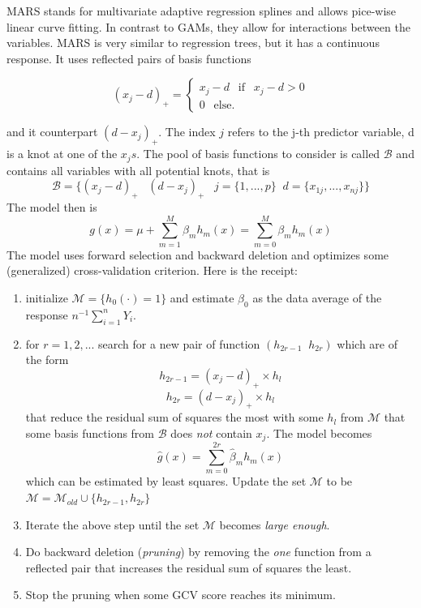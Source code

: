 \documentclass[]{book}
\providecommand{\tightlist}{%
  \setlength{\itemsep}{0pt}\setlength{\parskip}{0pt}}
\begin{document}
MARS stands for multivariate adaptive regression splines and allows
pice-wise linear curve fitting. In contrast to GAMs, they allow for
interactions between the variables. MARS is very similar to regression
trees, but it has a continuous response. It uses reflected pairs of
basis functions

\begin{equation} 
  (x_j -d)_{+} = \begin{cases} x_j - d \;\;\ \text{if} \;\;\ x_j - d > 0 \\ 
  0 \;\;\ \text{else}. 
  \end{cases} 
\end{equation}

and it counterpart \((d - x_j)_{+}\). The index \(j\) refers to the j-th
predictor variable, d is a knot at one of the \(x_js\). The pool of
basis functions to consider is called \(\mathcal{B}\) and contains all
variables with all potential knots, that is \[
\mathcal{B} = \{(x_j - d)_+ \;\;\; (d - x_j)_+ \;\;\;j = \{1, ..., p\} \;\; d =
\{x_{1j}, ..., x_{nj}\}\}\] The model then is
\[ g(x)  = \mu + \sum\limits_{m =
1}^M\beta_m h_m(x) = \sum\limits_{m = 0}^M\beta_m h_m(x)\] The model
uses forward selection and backward deletion and optimizes some
(generalized) cross-validation criterion. Here is the receipt:

\begin{enumerate}
\def\labelenumi{\arabic{enumi}.}
\tightlist
\item
  initialize \(\mathcal{M} = \{h_0(\cdot) = 1\}\) and estimate
  \(\beta_0\) as the data average of the response
  \(n^{-1}\sum\limits_{i = 1}^n Y_i\).
\item
  for \(r = 1, 2, ...\) search for a new pair of function
  \((h_{2 r-1} \;\;  h_{2 r})\) which are of the form
  \[h_{2 r-1} = (x_j -d)_+ \times h_l\] \[h_{2 r} = (d -
     x_j)_+ \times h_l\] that reduce the residual sum of squares the
  most with some \(h_l\) from \(\mathcal{M}\) that some basis functions
  from \(\mathcal{B}\) does \emph{not} contain \(x_j\). The model
  becomes \[\hat{g}(x) = \sum\limits_{m = 0}^{2r}\hat{\beta}_m
     h_m(x)\] which can be estimated by least squares. Update the set
  \(\mathcal{M}\) to be
  \(\mathcal{M} = \mathcal{M}_{old} \cup \{h_{2r-1}, h_{2r}\}\)
\item
  Iterate the above step until the set \(\mathcal{M}\) becomes
  \emph{large enough}.
\item
  Do backward deletion (\emph{pruning}) by removing the \emph{one}
  function from a reflected pair that increases the residual sum of
  squares the least.
\item
  Stop the pruning when some GCV score reaches its minimum.
\end{enumerate}
\end{document}
